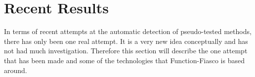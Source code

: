 %

\section{Recent Results}


In terms of recent attempts at the automatic detection of pseudo-tested methods, there has only been one real attempt. It is a very new idea conceptually and has not had much investigation. Therefore this section will describe the one attempt that has been made and some of the technologies that Function-Fiasco is based around.

